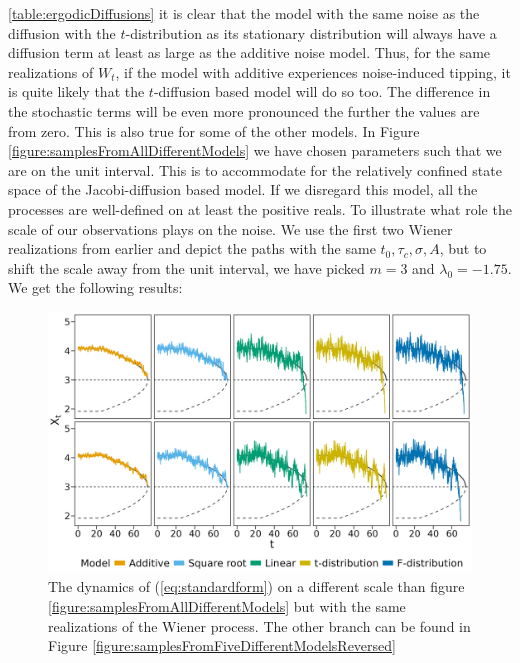 \ref{table:ergodicDiffusions} it is clear that the model with the same noise as the diffusion with the $t$-distribution as its stationary distribution will always have a diffusion term at least as large as the additive noise model. Thus, for the same realizations of $W_t$, if the model with additive experiences noise-induced tipping, it is quite likely that the $t$-diffusion based model will do so too. The difference in the stochastic terms will be even more pronounced the further the values are from zero. This is also true for some of the other models. In Figure \ref{figure:samplesFromAllDifferentModels} we have chosen parameters such that we are on the unit interval. This is to accommodate for the relatively confined state space of the Jacobi-diffusion based model. If we disregard this model, all the processes are well-defined on at least the positive reals. To illustrate what role the scale of our observations plays on the noise. We use the first two Wiener realizations from earlier and depict the paths with the same $t_0, \tau_c, \sigma, A$, but to shift the scale away from the unit interval, we have picked $m = 3$ and $\lambda_0 = -1.75$. We get the following results:
\begin{figure}[h]
    \begin{center}
        \includegraphics[scale = .075]{figures/sample_paths_plot_big_scale.jpeg}
        \caption{The dynamics of (\ref{eq:standardform}) on a different scale than figure \ref{figure:samplesFromAllDifferentModels} but with the same realizations of the Wiener process. The other branch can be found in Figure \ref{figure:samplesFromFiveDifferentModelsReversed}}
        \label{figure:samplesFromFiveDifferentModels}
    \end{center}
\end{figure}\\
